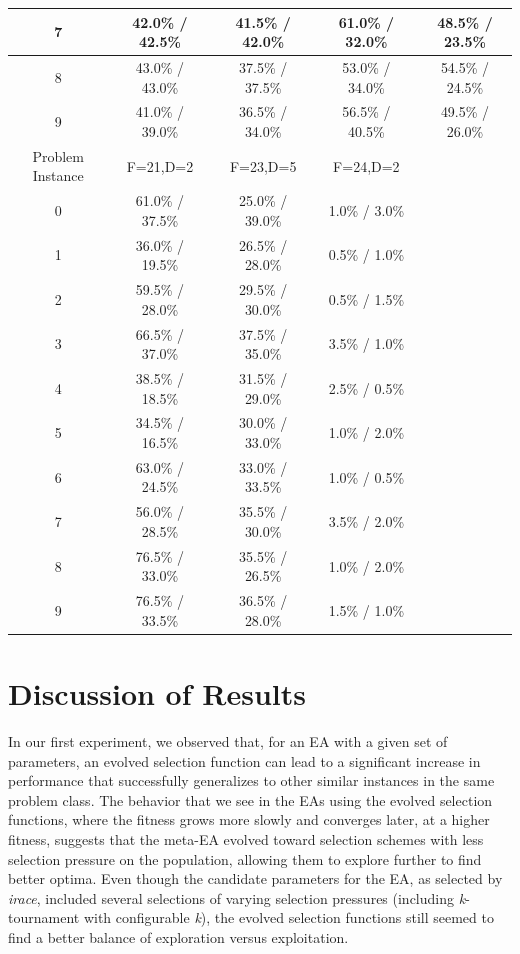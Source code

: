 \documentclass[times,12pt,titlepage]{mstogs}
\begin{document}
\begin{ThesisBody}
\begin{table}[htbp]
\begin{tabular}{c|c|c|c|c}
		\hline
		7 & 42.0\% / 42.5\% & 41.5\% / 42.0\% & 61.0\% / 32.0\% & 48.5\% / 23.5\%\\
		\hline
		8 & 43.0\% / 43.0\% & 37.5\% / 37.5\% & 53.0\% / 34.0\% & 54.5\% / 24.5\%\\
		\hline
		9 & 41.0\% / 39.0\% & 36.5\% / 34.0\% & 56.5\% / 40.5\% & 49.5\% / 26.0\%\\
		\hline
		\hline
		Problem Instance & F=21,D=2 & F=23,D=5 & F=24,D=2 & \\
		\hline
		0 & 61.0\% / 37.5\% & 25.0\% / 39.0\% & 1.0\% / 3.0\%& \\
		\hline
		1 & 36.0\% / 19.5\% & 26.5\% / 28.0\% & 0.5\% / 1.0\%& \\
		\hline
		2 & 59.5\% / 28.0\% & 29.5\% / 30.0\% & 0.5\% / 1.5\%& \\
		\hline
		3 & 66.5\% / 37.0\% & 37.5\% / 35.0\% & 3.5\% / 1.0\%& \\
		\hline
		4 & 38.5\% / 18.5\% & 31.5\% / 29.0\% & 2.5\% / 0.5\%& \\
		\hline
		5 & 34.5\% / 16.5\% & 30.0\% / 33.0\% & 1.0\% / 2.0\%& \\
		\hline
		6 & 63.0\% / 24.5\% & 33.0\% / 33.5\% & 1.0\% / 0.5\%& \\
		\hline
		7 & 56.0\% / 28.5\% & 35.5\% / 30.0\% & 3.5\% / 2.0\%& \\
		\hline
		8 & 76.5\% / 33.0\% & 35.5\% / 26.5\% & 1.0\% / 2.0\%& \\
		\hline
		9 & 76.5\% / 33.5\% & 36.5\% / 28.0\% & 1.5\% / 1.0\%& \\
		
		\bottomrule
	\end{tabular}
\end{table}
\FloatBarrier

\section{Discussion of Results}
\label{resultsDiscussion}

In our first experiment, we observed that, for an EA with a given set of parameters, an evolved selection function can lead to a significant increase in performance that successfully generalizes to other similar instances in the same problem class. The behavior that we see in the EAs using the evolved selection functions, where the fitness grows more slowly and converges later, at a higher fitness, suggests that the meta-EA evolved toward selection schemes with less selection pressure on the population, allowing them to explore further to find better optima. Even though the candidate parameters for the EA, as selected by \textit{irace}, included several selections of varying selection pressures (including \textit{k}-tournament with configurable \textit{k}), the evolved selection functions still seemed to find a better balance of exploration versus exploitation.


\end{ThesisBody}
\end{document}
